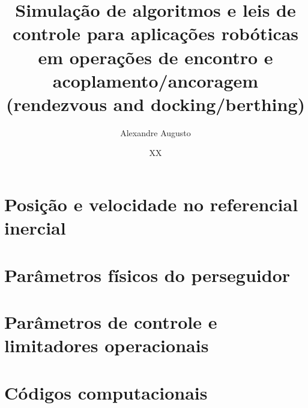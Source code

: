 \documentclass[msc]{ita}    %
\author{Alexandre Augusto}{Santana de Oliveira}
\title{Simulação de algoritmos e leis de controle para aplicações robóticas em operações de encontro e acoplamento/ancoragem (rendezvous and docking/berthing)}
\date{XX}{fevereiro}{2026}
\begin{document}
\frontmatter



\mainmatter










% 


\renewcommand\bibname{\itareferencesnamebabel} %
\printbibliography

\appendix
\chapter{Posição e velocidade no referencial inercial}
% 

\chapter{Parâmetros físicos do perseguidor}
% 

\chapter{Parâmetros de controle e limitadores operacionais}
% 

\chapter{Códigos computacionais}
% 

\annex
% 

\printglossary
\end{document}
